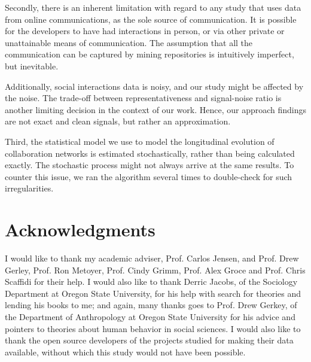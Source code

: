 \documentclass[12pt]{report}
\begin{document}
Secondly, there is an inherent limitation with regard to any study that uses data from online communications, as the sole source of communication. It is possible for the developers to have had interactions in person, or via other private or unattainable means of communication. The assumption that all the communication can be captured by mining repositories is intuitively imperfect, but inevitable.

Additionally, social interactions data is noisy, and our study might be affected by the noise. The trade-off between representativeness and signal-noise ratio is another limiting decision in the context of our work. Hence, our approach findings are not exact and clean signals, but rather an approximation.

Third, the statistical model we use to model the longitudinal evolution of collaboration networks is estimated stochastically, rather than being calculated exactly. The stochastic process might not always arrive at the same results. To counter this issue, we ran the algorithm several times to double-check for such irregularities.


\section*{Acknowledgments}
\label{acknowledgments}
I would like to thank my academic adviser, Prof. Carlos Jensen, and Prof. Drew Gerley, Prof. Ron Metoyer, Prof. Cindy Grimm, Prof. Alex Groce and Prof. Chris Scaffidi for their help. I would also like to thank Derric Jacobs, of the Sociology Department at Oregon State University, for his help with search for theories and lending his books to me; and again, many thanks goes to Prof. Drew Gerkey, of the Department of Anthropology at Oregon State University for his advice and pointers to theories about human behavior in social sciences. I would also like to thank the open source developers of the projects studied for making their data available, without which this study would not have been possible. \\

%

\pagebreak
\end{document}
